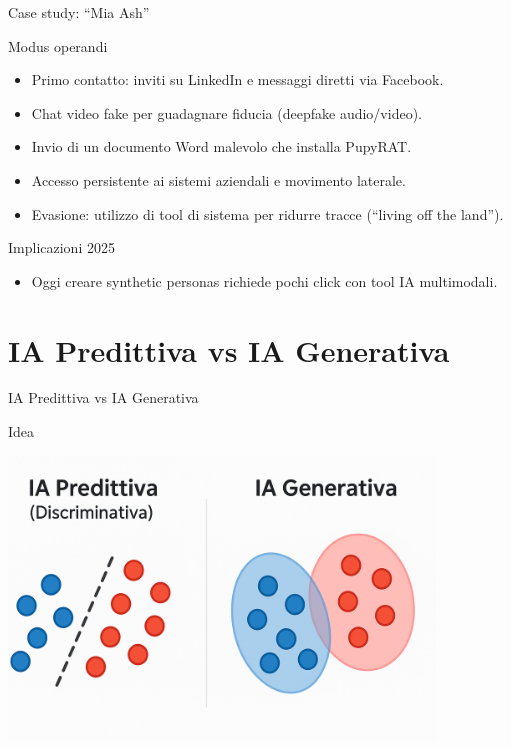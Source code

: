 \documentclass[12pt]{beamer}
\begin{document}
\begin{frame}{Case study: “Mia Ash”}
  \begin{alertblock}{Modus operandi}
    \begin{itemize}
      \item Primo contatto: inviti su LinkedIn e messaggi diretti via Facebook.
      \item Chat video fake per guadagnare fiducia (deepfake audio/video).
      \item Invio di un documento Word malevolo che installa PupyRAT.
      \item Accesso persistente ai sistemi aziendali e movimento laterale.
      \item Evasione: utilizzo di tool di sistema per ridurre tracce (“living off the land”).
    \end{itemize}
  \end{alertblock}
  \begin{alertblock}{Implicazioni 2025}
    \begin{itemize}
      \item Oggi creare synthetic personas richiede pochi click con tool IA multimodali.
    \end{itemize}
  \end{alertblock}
\end{frame}


\section{IA Predittiva vs IA Generativa}

\begin{frame}
\Huge
\begin{center}
IA Predittiva vs IA Generativa
\end{center}
\end{frame}


\begin{frame}{Idea}
  \begin{center}
    \includegraphics[width=0.85\textwidth]{Pic/disVSgen.png}
  \end{center}
\end{frame}
\end{document}
